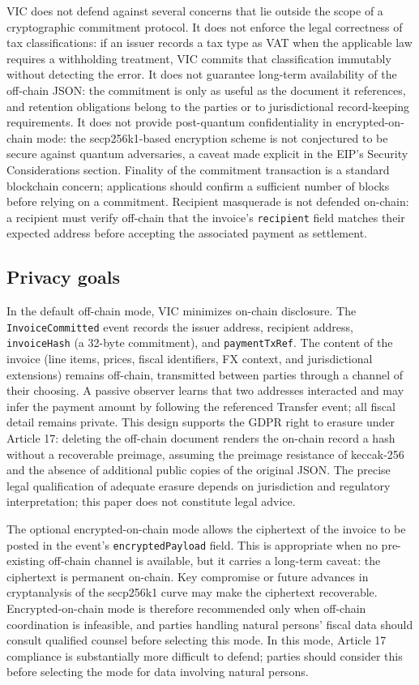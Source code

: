 \documentclass[11pt,a4paper]{article}
\begin{document}
VIC does not defend against several concerns that lie outside the scope of a cryptographic commitment protocol. It does not enforce the legal correctness of tax classifications: if an issuer records a tax type as VAT when the applicable law requires a withholding treatment, VIC commits that classification immutably without detecting the error. It does not guarantee long-term availability of the off-chain JSON: the commitment is only as useful as the document it references, and retention obligations belong to the parties or to jurisdictional record-keeping requirements. It does not provide post-quantum confidentiality in encrypted-on-chain mode: the secp256k1-based encryption scheme is not conjectured to be secure against quantum adversaries, a caveat made explicit in the EIP's Security Considerations section. Finality of the commitment transaction is a standard blockchain concern; applications should confirm a sufficient number of blocks before relying on a commitment. Recipient masquerade is not defended on-chain: a recipient must verify off-chain that the invoice's \texttt{recipient} field matches their expected address before accepting the associated payment as settlement.

\subsection{Privacy goals}

In the default off-chain mode, VIC minimizes on-chain disclosure. The \texttt{InvoiceCommitted} event records the issuer address, recipient address, \texttt{invoiceHash} (a 32-byte commitment), and \texttt{paymentTxRef}. The content of the invoice (line items, prices, fiscal identifiers, FX context, and jurisdictional extensions) remains off-chain, transmitted between parties through a channel of their choosing. A passive observer learns that two addresses interacted and may infer the payment amount by following the referenced Transfer event; all fiscal detail remains private. This design supports the GDPR right to erasure under Article 17: deleting the off-chain document renders the on-chain record a hash without a recoverable preimage, assuming the preimage resistance of keccak-256 and the absence of additional public copies of the original JSON. The precise legal qualification of adequate erasure depends on jurisdiction and regulatory interpretation; this paper does not constitute legal advice.

The optional encrypted-on-chain mode allows the ciphertext of the invoice to be posted in the event's \texttt{encryptedPayload} field. This is appropriate when no pre-existing off-chain channel is available, but it carries a long-term caveat: the ciphertext is permanent on-chain. Key compromise or future advances in cryptanalysis of the secp256k1 curve may make the ciphertext recoverable. Encrypted-on-chain mode is therefore recommended only when off-chain coordination is infeasible, and parties handling natural persons' fiscal data should consult qualified counsel before selecting this mode. In this mode, Article 17 compliance is substantially more difficult to defend; parties should consider this before selecting the mode for data involving natural persons.
\end{document}
